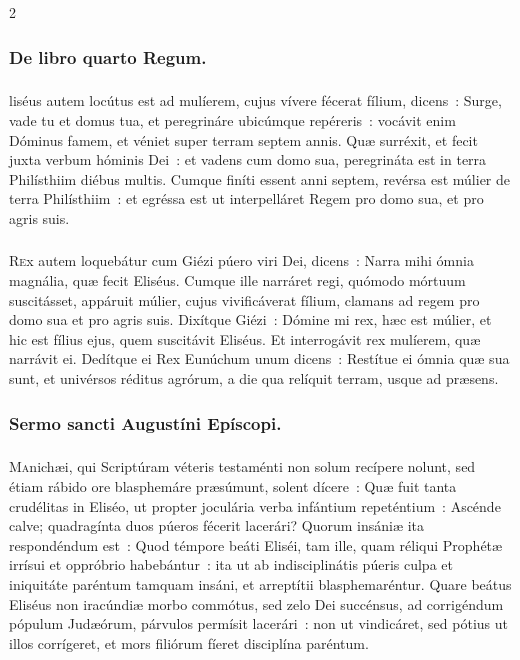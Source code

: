 \documentclass[9pt,twoside]{extarticle}
\begin{document}
\begin{multicols}{2}
\subsubsection*{\center De libro quarto Regum.}
\subsubsection*{\center {}}
liséus autem locútus est ad mulíerem, cujus vívere fécerat fílium, dicens~: Surge, vade tu et domus tua, et peregrináre ubicúmque repéreris~: vocávit enim Dóminus famem, et véniet super terram septem annis.
Quæ surréxit, et fecit juxta verbum hóminis Dei~: et vadens cum domo sua, peregrináta est in terra Philísthiim diébus multis.
Cumque finíti essent anni septem, revérsa est múlier de terra Philísthiim~: et egréssa est ut interpelláret Regem pro domo sua, et pro agris suis.

\begin{tightlist}{}
\item {} 
\end{tightlist}

\subsubsection*{\center {}}
\lettrine{R}ex autem loquebátur cum Giézi púero viri Dei, dicens~: Narra mihi ómnia magnália, quæ fecit Eliséus.
Cumque ille narráret regi, quómodo mórtuum suscitásset, appáruit múlier, cujus vivificáverat fílium, clamans ad regem pro domo sua et pro agris suis. Dixítque Giézi~: Dómine mi rex, hæc est múlier, et hic est fílius ejus, quem suscitávit Eliséus.
Et interrogávit rex mulíerem, quæ narrávit ei. Dedítque ei Rex Eunúchum unum dicens~: Restítue ei ómnia quæ sua sunt, et univérsos réditus agrórum, a die qua relíquit terram, usque ad præsens.

\subsubsection*{\center Sermo sancti Augustíni Epíscopi.}
\subsubsection*{\center {}}
\lettrine{M}anichæi, qui Scriptúram véteris testaménti non solum recípere nolunt, sed étiam rábido ore blasphemáre præsúmunt, solent dícere~: Quæ fuit tanta crudélitas in Eliséo, ut propter joculária verba infántium repeténtium~: Ascénde calve; quadragínta duos púeros fécerit lacerári? Quorum insániæ ita respondéndum est~: Quod témpore beáti Eliséi, tam ille, quam réliqui Prophétæ irrísui et oppróbrio habebántur~: ita ut ab indisciplinátis púeris culpa et iniquitáte paréntum tamquam insáni, et arreptítii blasphemaréntur. Quare beátus Eliséus non iracúndiæ morbo commótus, sed zelo Dei succénsus, ad corrigéndum pópulum Judæórum, párvulos permísit lacerári~: non ut vindicáret, sed pótius ut illos corrígeret, et mors filiórum fíeret disciplína paréntum.


\end{multicols}
\end{document}
